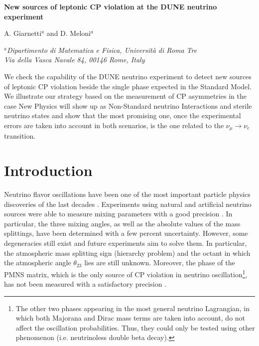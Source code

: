 \documentclass[12pt]{article}
\begin{document}
\begin{center}

\textbf{\Large 
New sources of leptonic CP violation at the DUNE neutrino experiment
} 

\vspace{30pt}
 A. Giarnetti$^a$ and D. Meloni$^a$
\vspace{16pt}


\textit{$^a$Dipartimento di Matematica e Fisica, 
Universit\`a di Roma Tre\\Via della Vasca Navale 84, 00146 Rome, Italy}\\
\vspace{16pt}





\end{center} 

\abstract

We check the capability of the DUNE neutrino experiment to detect new sources of leptonic CP violation beside the single phase expected in the Standard Model. We illustrate our strategy based on the measurement of CP asymmetries in the case New Physics will show up as Non-Standard neutrino  Interactions and sterile neutrino states and show that the most promising one, once the experimental errors are taken into account in both scenarios, is the one related to the $\nu_\mu \to \nu_e$ transition.

\section{Introduction}
Neutrino flavor oscillations have been one of the most important particle physics discoveries of the last decades \cite{Fukuda:1998mi}. Experiments using natural and artificial neutrino sources were able to measure mixing parameters with a good precision \cite{Esteban:2020cvm,deSalas:2020pgw}. In particular, the three mixing angles, as well as the absolute values of the mass splittings,  have been determined with a few percent uncertainty. However, some degeneracies still exist and future experiments aim to solve them. In particular, the atmospheric mass splitting sign (hierarchy problem) and the octant in which the atmospheric angle $\theta_{23}$ lies are still unknown. Moreover, the phase of the PMNS matrix, which is the only source of CP violation in neutrino oscillation\footnote{The other two phases appearing in the most general neutrino Lagrangian, in which both Majorana and Dirac mass terms are taken into account, do not affect the oscillation probabilities. Thus, they could only be tested using other phenomenon (i.e. neutrinoless double beta decay).}, has not been measured with a satisfactory precision \cite{Kolupaeva:2020pug, Abe:2021gky}.  
\end{document}
